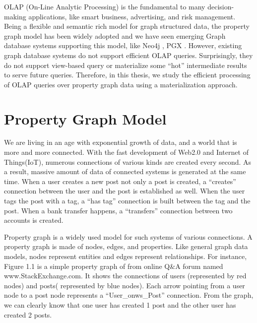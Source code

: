 

OLAP (On-Line Analytic Processing) is the fundamental to many decision-making applications, like smart business, advertising, and risk management. Being a flexible and semantic rich model for graph structured data, the property graph model has been widely adopted and we have seen emerging Graph database systems supporting this model, like Neo4j \cite{DBLP:conf/oopsla/Webber12}, PGX \cite{DBLP:conf/sc/HongDMLVC15}. However, existing graph database systems do not support efficient OLAP queries. Surprisingly, they do not support view-based query or materialize some ``hot'' intermediate results to serve future queries. Therefore, in this thesis, we study the efficient processing of OLAP queries over property graph data using a materialization approach. 


\section{Property Graph Model}

We are living in an age with exponential growth of data, and a world that is more and more connected.  With the fast development of Web2.0 and Internet of Things(IoT), numerous connections of various kinds are created every second. As a result, massive amount of data of connected systems is generated at the same time. When a user creates a new post not only a post is created,  a ``creates'' connection between the user and the post is established as well. When the user tags the post with a tag, a ``has tag'' connection is built between the tag and the post. When a bank transfer happens, a ``transfers'' connection between two accounts is created.

Property graph is a widely used model for such systems of various connections. A property graph is made of nodes, edges, and properties. Like general graph data models, nodes represent entities and edges represent relationships. For instance, Figure 1.1 is a simple property graph of from online Q\&A forum named www.StackExchange.com. It shows the connections of users (represented by red nodes) and posts( represented by blue nodes). Each arrow pointing from a user node  to a post node represents a ``User\_onws\_Post'' connection. From the graph, we can clearly know that  one user has created 1 post and the other user has created 2 posts. 

